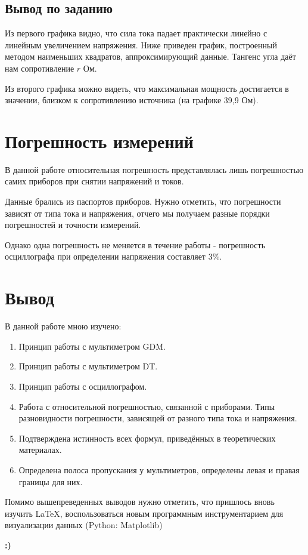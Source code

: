 \documentclass[a4paper,12pt]{article}
\begin{document}
\clearpage

\subsection{Вывод по заданию}
\hspace{\parindent}Из первого графика видно, что сила тока падает практически линейно с линейным увеличением напряжения. Ниже приведен график, построенный методом наименьших квадратов, аппроксимирующий данные. 
Тангенс угла даёт нам сопротивление $r$ \hspace{5pt}Ом.

Из второго графика можно видеть, что максимальная мощность достигается в значении, близком к сопротивлению источника (на графике 39,9  \hspace{5pt}Ом).



\section{Погрешность измерений}
\hspace{\parindent}В данной работе относительная погрешность представлялась лишь погрешностью самих приборов при снятии напряжений и токов.

Данные брались из паспортов приборов. Нужно отметить, что погрешности зависят от типа тока и напряжения, отчего мы получаем разные порядки погрешностей и точности измерений.

Однако одна погрешность не меняется в течение работы - погрешность осциллографа при определении напряжения составляет 3\%.
\section{Вывод}

В данной работе мною изучено:
\begin{enumerate}
    \item Принцип работы с мультиметром GDM.
    \item Принцип работы с мультиметром DT.
    \item Принцип работы с осциллографом.
    \item Работа с относительной погрешностью, связанной с приборами. Типы разновидности погрешности, зависящей от разного типа тока и напряжения.
    \item Подтверждена истинность всех формул, приведённых в теоретических материалах.
    \item Определена полоса пропускания у мультиметров, определены левая и правая границы для них.
\end{enumerate}
Помимо вышепреведенных выводов нужно отметить, что пришлось вновь изучить \LaTeX, воспользоваться новым программным инструментарием для визуализации данных (Python: Matplotlib)

\centering \textbf{:)}
\end{document}
